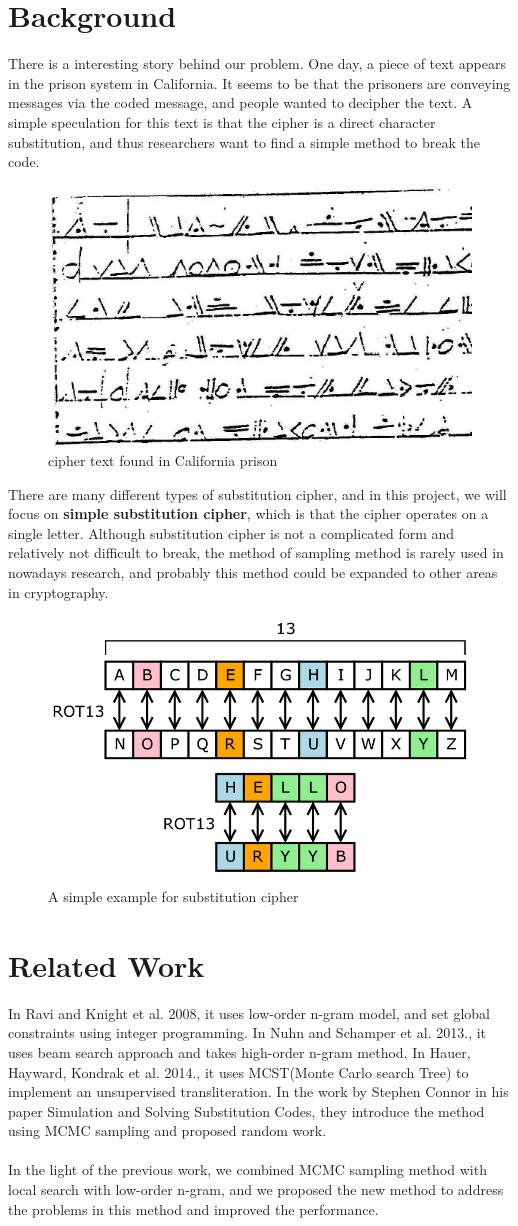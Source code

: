 \documentclass{acmtog} %
\begin{document}
\section{Background}
%
There is a interesting story behind our problem. One day, a piece of text appears in the prison system in California. It seems to be that the prisoners are conveying messages via the coded message, and people wanted to decipher the text. A simple speculation for this text is that the cipher is a direct character substitution, and thus researchers want to find a simple method to break the code.
\begin{figure}[ht]
  \includegraphics[width=.4\textwidth]{pic/CA.JPG} 
  \caption{cipher text found in California prison} 
  \label{CA}
\end{figure}
There are many different types of substitution cipher, and in this project, we will focus on \textbf{simple substitution cipher}, which is that the cipher operates on a single letter. Although substitution cipher is not a complicated form and relatively not difficult to break, the method of sampling method is rarely used in nowadays research, and probably this method could be expanded to other areas in cryptography.
\begin{figure}[ht]
  \includegraphics[width=.35\textwidth]{pic/direct.png} 
  \caption{A simple example for substitution cipher} 
  \label{direct}
\end{figure}

\section{Related Work}
In Ravi and Knight et al. 2008\cite{Ravi}, it uses low-order n-gram model, and set global constraints using integer programming. In Nuhn and Schamper et al. 2013.\cite{Nuhn}, it uses beam search approach and takes high-order n-gram method. In Hauer, Hayward, Kondrak et al. 2014.\cite{Hauer}, it uses MCST(Monte Carlo search Tree) to implement an unsupervised transliteration. In the work by Stephen Connor in his paper Simulation and Solving Substitution Codes\cite{Conner}, they introduce the method using MCMC sampling and proposed random work.\\\\
In the light of the previous work, we combined MCMC sampling method with local search with low-order n-gram, and we proposed the new method to address the problems in this method and improved the performance. 
\end{document}
